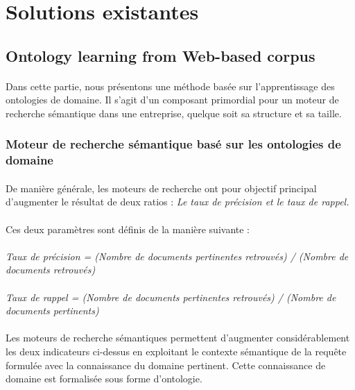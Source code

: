 \documentclass[12pt, a4paper, oneside]{book}
\begin{document}
\newpage
\section{Solutions existantes}

\subsection{Ontology learning from Web-based corpus}

\paragraph{}
Dans cette partie, nous présentons une méthode basée sur l'apprentissage des ontologies de domaine\citep{inproceedings}. Il s'agit d'un composant primordial pour un moteur de recherche sémantique dans une entreprise, quelque soit sa structure et sa taille.
\subsubsection{Moteur de recherche sémantique basé sur les ontologies de domaine}
\paragraph{}
De manière générale, les moteurs de recherche ont pour objectif principal d'augmenter le résultat de deux ratios : \emph{Le taux de précision et le taux de rappel.} \citep{defOnto}

\paragraph{}
Ces deux paramètres sont définis de la manière suivante : 

\paragraph{}

\emph{Taux de précision = (Nombre de documents pertinentes retrouvés) / (Nombre de documents retrouvés)
}
\paragraph{}

\emph{Taux de rappel = (Nombre de documents pertinentes retrouvés) / (Nombre de documents pertinents)
}
\paragraph{}
Les moteurs de recherche sémantiques permettent d'augmenter considérablement les deux indicateurs ci-dessus en exploitant le contexte sémantique de la requête formulée avec la connaissance du domaine pertinent.
Cette connaissance de domaine est formalisée sous forme d'ontologie.
\end{document}
